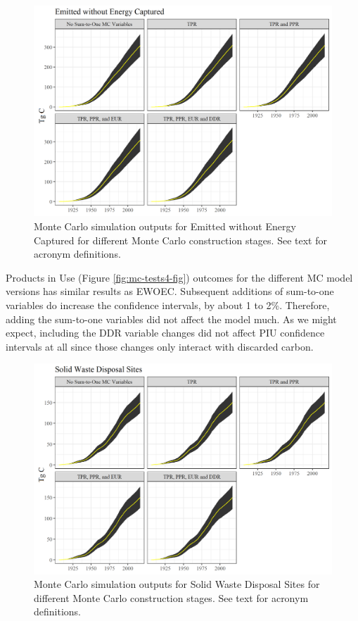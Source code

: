 \documentclass[
]{book}
\begin{document}
\begin{figure}
\includegraphics[width=1\linewidth]{images/MC_tests2} \caption{Monte Carlo simulation outputs for Emitted without Energy Captured for different Monte Carlo construction stages.  See text for acronym definitions.}\label{fig:mc-tests2-fig}
\end{figure}

Products in Use (Figure \ref{fig:mc-tests4-fig}) outcomes for the different MC model versions has similar results as EWOEC. Subsequent additions of sum-to-one variables do increase the confidence intervals, by about 1 to 2\%. Therefore, adding the sum-to-one variables did not affect the model much. As we might expect, including the DDR variable changes did not affect PIU confidence intervals at all since those changes only interact with discarded carbon.

\begin{figure}
\includegraphics[width=1\linewidth]{images/MC_tests3} \caption{Monte Carlo simulation outputs for Solid Waste Disposal Sites for different Monte Carlo construction stages.  See text for acronym definitions.}\label{fig:mc-tests3-fig}
\end{figure}
\end{document}

